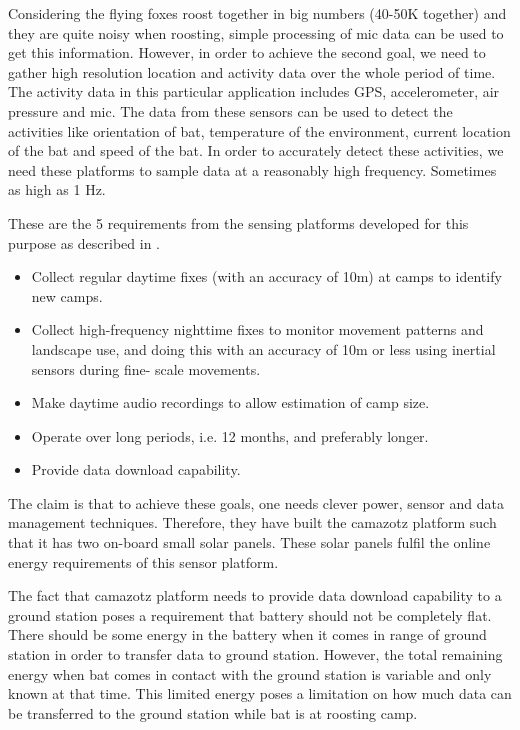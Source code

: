 \documentclass[conference]{IEEEtran}
\begin{document}
Considering the flying foxes roost together in big numbers (40-50K together) and they are quite noisy when roosting\cite{Shilton-2008}, simple processing of mic data can be used to get this information. However, in order to achieve the second goal, we need to gather high resolution location and activity data over the whole period of time. The activity data in this particular application includes GPS, accelerometer, air pressure and mic. The data from these sensors can be used to detect the activities like orientation of bat, temperature of the environment, current location of the bat and speed of the bat. In order to accurately detect these activities, we need these platforms to sample data at a reasonably high frequency. Sometimes as high as 1 Hz. \

These are the 5 requirements from the sensing platforms developed for this purpose as described in \cite{raja-ipsn}.
\begin{itemize}
\item Collect regular daytime fixes (with an accuracy of 10m) at camps to identify new camps.
\item Collect high-frequency nighttime fixes to monitor movement patterns and landscape use, and doing this with an accuracy of 10m or less using inertial sensors during fine- scale movements.
\item Make daytime audio recordings to allow estimation of camp size.
\item Operate over long periods, i.e. 12 months, and preferably longer.
\item Provide data download capability.
\end{itemize}

The claim is that to achieve these goals, one needs clever power, sensor and data management techniques. Therefore, they have built the camazotz platform such that it has two on-board small solar panels. These solar panels fulfil the online energy requirements of this sensor platform\cite{raja-ipsn}.\

The fact that camazotz platform needs to provide data download capability to a ground station poses a requirement that battery should not be completely flat. There should be some energy in the battery when it comes in range of ground station in order to transfer data to ground station. However, the total remaining energy when bat comes in contact with the ground station is variable and only known at that time. This limited energy poses a limitation on how much data can be transferred to the ground station while bat is at roosting camp.\
\end{document}
